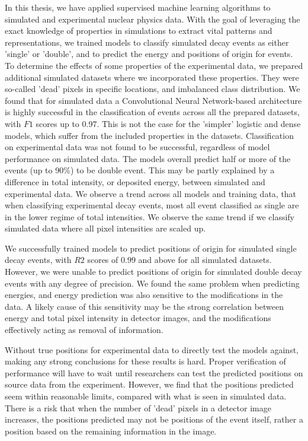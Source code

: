 In this thesis, we have applied supervised machine learning algorithms to simulated and experimental
nuclear physics data. With the goal of leveraging the exact knowledge of properties in simulations to extract
vital patterns and representations, we trained models to classify simulated decay events as either 'single'
or 'double', and to predict the energy and positions of origin for events. To determine the effects of
some properties of the experimental data, we prepared additional simulated datasets where we incorporated
these properties. They were so-called 'dead' pixels in specific locations, and imbalanced class distribution.
We found that for simulated data a Convolutional Neural Network-based architecture is highly successful in the
classification of events across all the prepared datasets, with $F1$ scores up to $0.97$. 
This is not the case for the 'simpler' logistic and dense models, which suffer from the included properties 
in the datasets. 
Classification on experimental data was not found to be successful, regardless of model performance on
simulated data. The models overall predict half or more of the events (up to 90\%) to be
double event. This may be partly explained by a difference in total intensity, or deposited energy,
between simulated and experimental data. We observe a trend across all models and training data, that
when classifying experimental decay events, most all event classified as single are in the lower
regime of total intensities. We observe the same trend if we classify simulated data where all pixel
intensities are scaled up.

We successfully trained models to predict positions of origin for simulated single decay events,
with $R2$ scores of $0.99$ and above for all simulated datasets. However, we were unable to
predict positions of origin for simulated double decay events with any degree of precision.
We found the same problem when predicting energies, and energy prediction was also sensitive
to the modifications in the data. A likely cause of this sensitivity may be the strong correlation
between energy and total pixel intensity in detector images, and the modifications effectively
acting as removal of information.

Without true positions for experimental data to directly test the models against,
making any strong conclusions for these results is hard. Proper verification of performance 
will have to wait until researchers can test the predicted positions on source data from the
experiment. However, we find that the positions predicted seem within reasonable limits, compared
with what is seen in simulated data. There is a risk that when the number of 'dead' pixels in a detector
image increases, the positions predicted may not be positions of the event itself, rather a position
based on the remaining information in the image.

